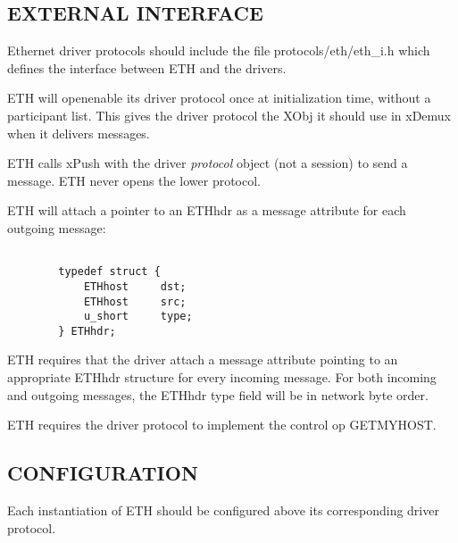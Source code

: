 \subsection*{EXTERNAL INTERFACE}

Ethernet driver protocols should include the file 
{\sanss protocols/eth/eth\_i.h} which defines the interface between ETH
and the drivers.

ETH will openenable its driver protocol once at initialization time,
without a participant list.  This gives the driver protocol
the XObj it should use in xDemux when it delivers messages.

ETH calls xPush with the driver {\em protocol} object (not a session)
to send a message.  ETH never opens the lower protocol.

ETH will attach a pointer to an ETHhdr as a message attribute for each
outgoing message:

\begin{verbatim}

        typedef struct {
            ETHhost     dst;
            ETHhost     src;
            u_short     type;
        } ETHhdr;

\end{verbatim}

ETH requires that the driver attach a message attribute pointing to an
appropriate ETHhdr structure for every incoming message.  For both
incoming and outgoing messages, the ETHhdr type field will be in 
network byte order.

ETH requires the driver protocol to implement the control op GETMYHOST.


\subsection*{CONFIGURATION}

Each instantiation of ETH should be configured above its corresponding
driver protocol.

